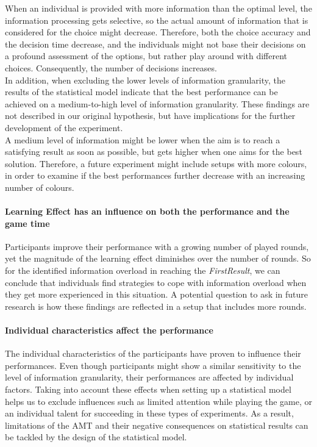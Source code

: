 When an individual is provided with more information than the optimal level, the information processing gets selective, so the actual amount of information that is considered for the choice might decrease. Therefore, both the choice accuracy and the decision time decrease, and the individuals might not base their decisions on a profound assessment of the options, but rather play around with different choices. Consequently, the number of decisions increases.\\
In addition, when excluding the lower levels of information granularity, the results of the statistical model indicate that the best performance can be achieved on a medium-to-high level of information granularity. These findings are not described in our original hypothesis, but have implications for the further development of the experiment.\\
A medium level of information might be lower when the aim is to reach a satisfying result as soon as possible, but gets higher when one aims for the best solution. Therefore, a future experiment might include setups with more colours, in order to examine if the best performances further decrease with an increasing number of colours. 

\paragraph{Learning Effect has an influence on both the performance and the game time} 

Participants improve their performance with a growing number of played rounds, yet the magnitude of the learning effect diminishes over the number of rounds. So for the identified information overload in reaching the \textit{FirstResult}, we can conclude that individuals find strategies to cope with information overload when they get more experienced in this situation. A potential question to ask in future research is how these findings are reflected in a setup that includes more rounds.

\paragraph{Individual characteristics affect the performance}
The individual characteristics of the  participants have proven to influence their performances. Even though participants might show a similar sensitivity to the level of information granularity, their performances are affected by individual factors. Taking into account these effects when setting up a statistical model helps us to exclude influences such as limited attention while playing the game, or an individual talent for succeeding in these types of experiments. As a result, limitations of the \acl{AMT} and their negative consequences on statistical results can be tackled by the design of the statistical model.

